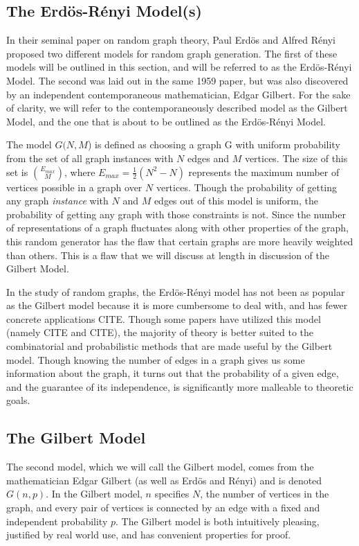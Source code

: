 \documentclass[11pt,a4paper]{report}
\begin{document}
\subsection{The Erd\"os-R\'enyi Model(s)}

In their seminal paper on random graph theory, Paul Erd\"os and Alfred R\'enyi proposed two different models for random graph generation.
The first of these models will be outlined in this section, and will be referred to as the Erd\"os-R\'enyi Model.
The second was laid out in the same 1959 paper, but was also discovered by an independent contemporaneous mathematician, Edgar Gilbert.
For the sake of clarity, we will refer to the contemporaneously described model as the Gilbert Model, and the one that is about to be outlined as the Erd\"os-R\'enyi Model.

The model $G(N, M$) is defined as choosing a graph G with uniform probability from the set of all graph instances with $N$ edges and $M$ vertices.
The size of this set is $\binom{E_{max}}{M}$, where $E_{max} = \frac{1}{2}(N^2 - N)$ represents the maximum number of vertices possible in a graph over $N$ vertices.
Though the probability of getting any graph \emph{instance} with $N$ and $M$ edges out of this model is uniform, the probability of getting any graph with those constraints is not.
Since the number of representations of a graph fluctuates along with other properties of the graph, this random generator has the flaw that certain graphs are more heavily weighted than others.
This is a flaw that we will discuss at length in discussion of the Gilbert Model.

In the study of random graphs, the Erd\"os-R\'enyi model has not been as popular as the Gilbert model because it is more cumbersome to deal with, and has fewer concrete applications CITE.
Though some papers have utilized this model (namely CITE and CITE), the majority of theory is better suited to the combinatorial and probabilistic methods that are made useful by the Gilbert model.
Though knowing the number of edges in a graph gives us some information about the graph, it turns out that the probability of a given edge, and the guarantee of its independence, is significantly more malleable to theoretic goals.

\subsection{The Gilbert Model}

The second model, which we will call the Gilbert model, comes from the mathematician Edgar Gilbert (as well as Erd\"os and R\'enyi) and is denoted $G(n, p)$.
In the Gilbert model, $n$ specifies $N$, the number of vertices in the graph, and every pair of vertices is connected by an edge with a fixed and independent probability $p$.
The Gilbert model is both intuitively pleasing, justified by real world use, and has convenient properties for proof.
\end{document}
